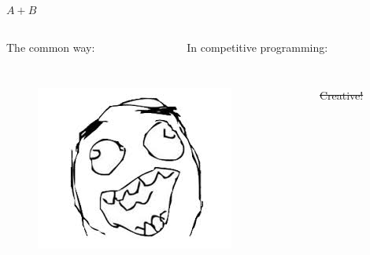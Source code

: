 \begin{frame}{$A+B$}
\begin{columns}
  \begin{column}{0.48\columnwidth}
   The common way:
  \inputminted[linenos=true, fontsize=\scriptsize, bgcolor=mygray, ]{python}{./src/plus0.py}
  \end{column}
  \begin{column}{0.48\columnwidth}
     In competitive programming:
    \inputminted[linenos=true, fontsize=\scriptsize, bgcolor=mygray, ]{python}{./src/plus1.py}
  \end{column}
\end{columns}

\begin{columns}
  \begin{column}{0.6\columnwidth}
    \begin{figure}
      \centering
      \includegraphics[width=.35\textwidth]{pic/rage.jpeg}
    \end{figure}
  \end{column}
  \begin{column}{0.4\columnwidth}
     \st{Creative!}
  \end{column}
\end{columns}
\end{frame}
